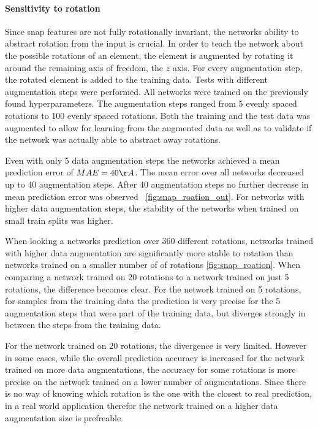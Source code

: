 \paragraph{Sensitivity to rotation}
Since snap features are not fully rotationally invariant, the networks ability to abstract rotation from the input is crucial.
In order to teach the network about the possible rotations of an element, 
the element is augmented by rotating it around the remaining axis of freedom, the $z$ axis.
For every augmentation step, the rotated element is added to the training data.
Tests with different augmentation steps were performed.
All networks were trained on the previously found hyperparameters.
The augmentation steps ranged from 5 evenly spaced rotations to 100 evenly spaced rotations.
Both the training and the test data was augmented to allow for learning from the augmented data
as well as to validate if the network was actually able to abstract away rotations.

Even with only 5 data augmentation steps the networks achieved a mean prediction error of $MAE = 40 \AA$.
The mean error over all networks decreased up to 40 augmentation steps.
After 40 augmentation steps no further decrease in mean prediction error was observed ~\ref{fig:snap_roation_out}.
For networks with higher data augmentation steps, the stability of the networks when trained on small train splits was higher.

When looking a networks prediction over 360 different rotations, networks trained with higher data augmentation 
are significantly more stable to rotation than networks trained on a smaller number of of rotations \ref{fig:snap_roation}.
When comparing a network trained on 20 rotations to a network trained on just 5 rotations,
the difference becomes clear.
For the network trained on 5 rotations, for samples from the training data the prediction is very precise 
for the 5 augmentation steps that were part of the training data, but diverges strongly in between the steps from the training data.

For the network trained on 20 rotations, the divergence is very limited.
However in some cases, while the overall prediction accuracy is increased for the network trained on 
more data augmentations, the accuracy for some rotations is more precise on the network trained on a lower number of augmentations.
Since there is no way of knowing which rotation is the one with the closest to real prediction, in 
a real world application therefor the network trained on a higher data augmentation size is prefreable.

